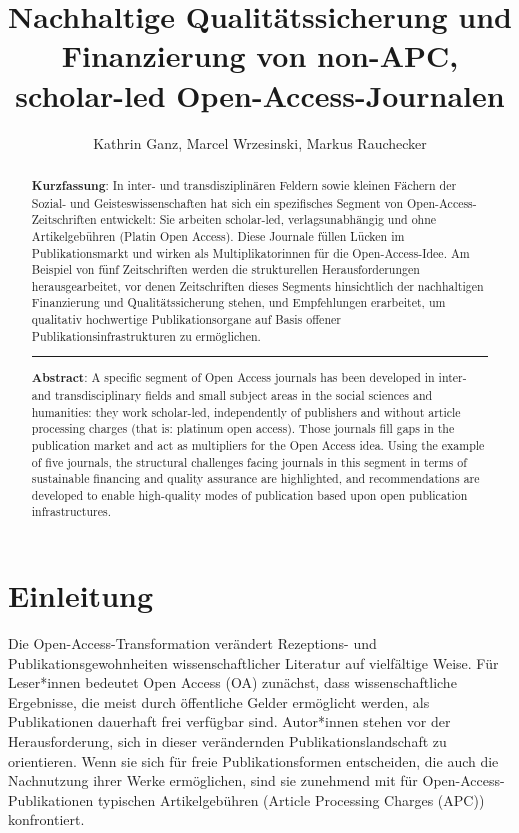 \documentclass[a4paper,
fontsize=11pt,
oneside,
numbers=noperiodatend,
parskip=half-,
bibliography=totoc,
final
]{scrartcl}
\title{\LARGE{Nachhaltige Qualitätssicherung und Finanzierung von non-APC, scholar-led Open-Access-Journalen}} %
\author{Kathrin Ganz, Marcel Wrzesinski, Markus Rauchecker} %
\date{}
\begin{document}
\maketitle
\thispagestyle{fancyplain} 

\begin{abstract}
\noindent
\textbf{Kurzfassung}: In inter- und transdisziplinären Feldern sowie
kleinen Fächern der Sozial- und Geisteswissenschaften hat sich ein
spezifisches Segment von Open-Ac\-cess-Zeitschriften entwickelt: Sie
arbeiten scholar-led, verlagsunabhängig und ohne Artikelgebühren (Platin
Open Access). Diese Journale füllen Lücken im Publikationsmarkt und
wirken als Multiplikatorinnen für die Open-Access-Idee. Am Beispiel von
fünf Zeitschriften werden die strukturellen Herausforderungen
herausgearbeitet, vor denen Zeitschriften dieses Segments hinsichtlich
der nachhaltigen Finanzierung und Qualitätssicherung stehen, und
Empfehlungen erarbeitet, um qualitativ hochwertige Publikationsorgane
auf Basis offener Publikationsinfrastrukturen zu ermöglichen.

\begin{center}\rule{0.5\linewidth}{\linethickness}\end{center}

\noindent\textbf{Abstract}: A specific segment of Open Access journals has been
developed in inter- and transdisciplinary fields and small subject areas
in the social sciences and humanities: they work scholar-led,
independently of publishers and without article processing charges (that
is: platinum open access). Those journals fill gaps in the publication
market and act as multipliers for the Open Access idea. Using the
example of five journals, the structural challenges facing journals in
this segment in terms of sustainable financing and quality assurance are
highlighted, and recommendations are developed to enable high-quality
modes of publication based upon open publication infrastructures.
\end{abstract}

\hypertarget{einleitung}{%
\section{Einleitung}\label{einleitung}}

Die Open-Access-Transformation verändert Rezeptions- und
Publikationsgewohnheiten wissenschaftlicher Literatur auf vielfältige
Weise. Für Leser*innen bedeutet Open Access (OA) zunächst, dass
wissenschaftliche Ergebnisse, die meist durch öffentliche Gelder
ermöglicht werden, als Publikationen dauerhaft frei verfügbar sind.
Autor*innen stehen vor der Herausforderung, sich in dieser verändernden
Publikationslandschaft zu orientieren. Wenn sie sich für freie
Publikationsformen entscheiden, die auch die Nachnutzung ihrer Werke
ermöglichen, sind sie zunehmend mit für Open-Access-Publikationen
typischen Artikelgebühren (Article Processing Charges (APC))
konfrontiert.
\end{document}
